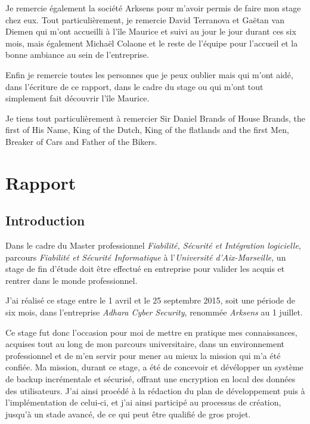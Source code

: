 \documentclass[a4paper,10pt, twoside]{report}
\begin{document}
\begin{spacing}{1.2}
Je remercie \'egalement la soci\'et\'e Arksens pour m'avoir permis de faire mon
stage chez eux. Tout particuli\`erement, je remercie David Terranova et Ga\"etan
van Diemen qui m'ont accueilli \`a l'\^ile Maurice et suivi au jour le jour
durant ces six mois, mais \'egalement Micha\"el Colaone et le reste de
l'\'equipe pour l'accueil et la bonne ambiance au sein de l'entreprise.

Enfin je remercie toutes les personnes que je peux oublier mais qui m'ont
aid\'e, dans l'\'ecriture de ce rapport, dans le cadre du stage ou qui m'ont
tout simplement fait d\'ecouvrir l'\^ile Maurice.

Je tiens tout particuli\`erement \`a remercier Sir Daniel Brands of House Brands,
the first of His Name, King of the Dutch, King of the flatlands and the first
Men, Breaker of Cars and Father of the Bikers.

\clearpage
\pagestyle{fancy}
\tableofcontents
\clearpage

\linenumbers
\part{Rapport}
\thispagestyle{empty}
\chapter{Introduction}
\thispagestyle{fancy}
Dans le cadre du Master professionnel \textit{Fiabilit\'e, S\'ecurit\'e et
Int\'egration logicielle}, parcours \textit{Fiabilit\'e et S\'ecurit\'e
Informatique} \`a l'\textit{Universit\'e d'Aix-Marseille}, un stage de fin
d'\'etude doit \^etre effectu\'e en entreprise pour valider les acquis et
rentrer dans le monde professionnel.

J'ai r\'ealis\'e ce stage entre le 1 avril et le 25 septembre 2015, soit
une p\'eriode de six mois, dans l'entreprise \textit{Adhara Cyber Security},
renomm\'ee \textit{Arksens} au 1 juillet.

Ce stage fut donc l'occasion pour moi de mettre en pratique mes connaissances,
acquises tout au long de mon parcours universitaire, dans un environnement
professionnel et de m'en servir pour mener au mieux la mission qui m'a
\'et\'e confi\'ee. Ma mission, durant ce stage, a \'et\'e de concevoir et
d\'ev\'elopper un syst\`eme de backup incr\'ementale et s\'ecuris\'e, offrant
une encryption en local des donn\'ees des utilisateurs. J'ai ainsi proc\'ed\'e
\`a la r\'edaction du plan de d\'eveloppement puis \`a l'impl\'ementation de
celui-ci, et j'ai ainsi particip\'e au processus de cr\'eation, jusqu'\`a un
stade avanc\'e, de ce qui peut \^etre qualifi\'e de gros projet.


\end{spacing}
\end{document}
